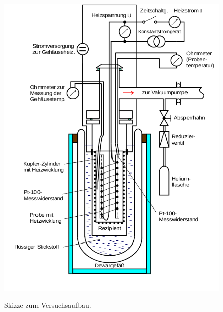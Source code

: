 \begin{figure}
  \centering
  \includegraphics{ressources/aufbau.png}
  \caption{Skizze zum Versuchsaufbau.}
  \label{fig:aufbau} \cite{skript}
\end{figure}
